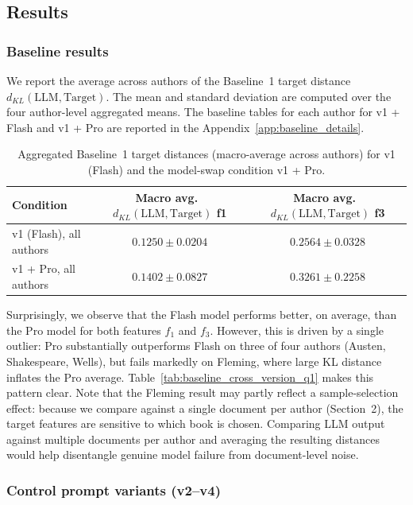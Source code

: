 \documentclass{article}
\begin{document}
\subsection{Results}
\subsubsection{Baseline results}
\label{subsec:baseline_aggregated}

We report the average across authors of the Baseline~1 target distance \(d_{KL}(\text{LLM}, \text{Target})\). The mean and standard deviation are computed over the four author-level aggregated means. The baseline tables for each author for v1 + Flash and v1 + Pro are reported in the Appendix~\ref{app:baseline_details}.

\begin{table}[htbp]
\centering
\begin{tabular}{lcc}
\toprule
Condition & Macro avg.\ \(d_{KL}(\text{LLM},\text{Target})\) f1 & Macro avg.\ \(d_{KL}(\text{LLM},\text{Target})\) f3 \\
\midrule
v1 (Flash), all authors & $0.1250 \pm 0.0204$ & $0.2564 \pm 0.0328$ \\
v1 + Pro, all authors & $0.1402 \pm 0.0827$ & $0.3261 \pm 0.2258$ \\
\end{tabular}
\caption{Aggregated Baseline~1 target distances (macro-average across authors) for v1 (Flash) and the model-swap condition v1 + Pro. }
\label{tab:baseline_aggregated_q1}
\end{table}

Surprisingly, we observe that the Flash model performs better, on average, than the Pro model for both features $f_1$ and $f_3$. However, this is driven by a single outlier: Pro substantially outperforms Flash on three of four authors (Austen, Shakespeare, Wells), but fails markedly on Fleming, where large KL distance inflates the Pro average. Table~\ref{tab:baseline_cross_version_q1} makes this pattern clear. Note that the Fleming result may partly reflect a sample-selection effect: because we compare against a single document per author (Section~2), the target features are sensitive to which book is chosen. Comparing LLM output against multiple documents per author and averaging the resulting distances would help disentangle genuine model failure from document-level noise.

\subsubsection{Control prompt variants (v2--v4)}
\label{subsec:other_versions_results}
\end{document}
